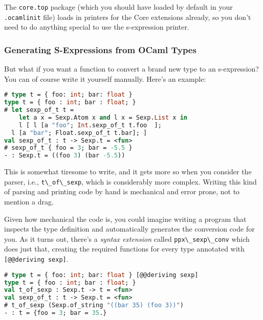 The \passthrough{\lstinline!core.top!} package (which you should have
loaded by default in your \passthrough{\lstinline!.ocamlinit!} file)
loads in printers for the Core extensions already, so you don't need to
do anything special to use the s-expression printer.

\hypertarget{generating-s-expressions-from-ocaml-types}{%
\subsubsection{Generating S-Expressions from OCaml
Types}\label{generating-s-expressions-from-ocaml-types}}

But what if you want a function to convert a brand new type to an
s-expression? You can of course write it yourself manually. Here's an
example: 

\begin{lstlisting}[language=Caml]
# type t = { foo: int; bar: float }
type t = { foo : int; bar : float; }
# let sexp_of_t t =
    let a x = Sexp.Atom x and l x = Sexp.List x in
    l [ l [a "foo"; Int.sexp_of_t t.foo  ];
  l [a "bar"; Float.sexp_of_t t.bar]; ]
val sexp_of_t : t -> Sexp.t = <fun>
# sexp_of_t { foo = 3; bar = -5.5 }
- : Sexp.t = ((foo 3) (bar -5.5))
\end{lstlisting}

This is somewhat tiresome to write, and it gets more so when you
consider the parser, i.e., \passthrough{\lstinline!t\_of\_sexp!}, which
is considerably more complex. Writing this kind of parsing and printing
code by hand is mechanical and error prone, not to mention a drag.

Given how mechanical the code is, you could imagine writing a program
that inspects the type definition and automatically generates the
conversion code for you. As it turns out, there's a \emph{syntax
extension} called \passthrough{\lstinline!ppx\_sexp\_conv!} which does
just that, creating the required functions for every type annotated with
\passthrough{\lstinline![@@deriving sexp]!}.

\begin{lstlisting}[language=Caml]
# type t = { foo: int; bar: float } [@@deriving sexp]
type t = { foo : int; bar : float; }
val t_of_sexp : Sexp.t -> t = <fun>
val sexp_of_t : t -> Sexp.t = <fun>
# t_of_sexp (Sexp.of_string "((bar 35) (foo 3))")
- : t = {foo = 3; bar = 35.}
\end{lstlisting}

